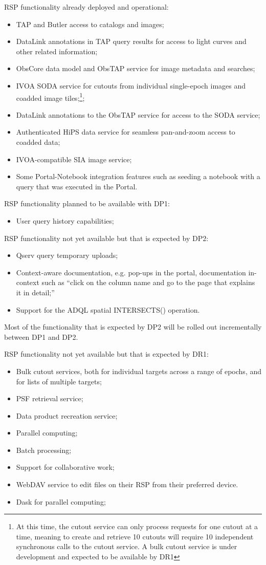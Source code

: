 RSP functionality already deployed and operational:
\begin{itemize}
\item TAP and Butler access to catalogs and images;
\item DataLink annotations in TAP query results for access to light curves and other related information;
\item ObsCore data model and ObsTAP service for image metadata and searches;
\item IVOA SODA service for cutouts from individual single-epoch images and coadded image tiles;\footnote{At this time, the cutout service can only process requests for one cutout at a time, meaning to create and retrieve 10 cutouts will require 10 independent synchronous calls to the cutout service. A bulk cutout service is under development and expected to be available by DR1};
\item DataLink annotations to the ObsTAP service for access to the SODA service;
\item Authenticated HiPS data service for seamless pan-and-zoom access to coadded data;
\item IVOA-compatible SIA image service;
\item Some Portal-Notebook integration features such as  seeding a notebook with a query that was executed in the Portal.
\end{itemize}

RSP functionality planned to be available with  DP1: 
\begin{itemize}
\item User query history capabilities;
\end{itemize}

RSP functionality not yet available but that is expected by DP2:
\begin{itemize}
\item Qserv query temporary uploads;
\item Context-aware documentation, e.g. pop-ups in the portal, documentation in-context such as  ``click on the column name and go to the page that explains it in detail;''
\item Support for the ADQL  spatial INTERSECTS() operation.
\end{itemize}
Most of the functionality  that is expected by DP2 will be rolled out incrementally between DP1 and DP2.

RSP functionality not yet available but that is expected by DR1:
\begin{itemize}
\item Bulk cutout services, both for individual targets across a range of epochs, and for lists of multiple targets;
\item PSF retrieval service;
\item Data product recreation service; 
\item Parallel computing;
\item Batch processing; 
\item Support for collaborative work;
\item WebDAV service to edit files on their RSP from their preferred device. 
\item Dask for parallel computing;
\end{itemize} 

